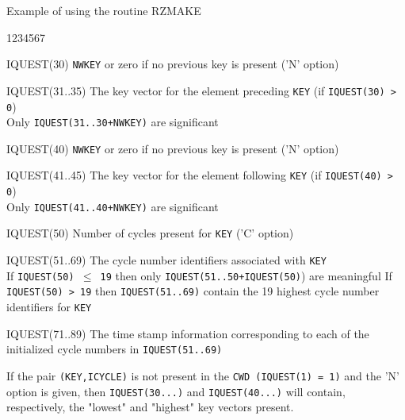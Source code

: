 \begin{XMPt}{Example of using the routine RZMAKE}
\begin{DLtt}{1234567}
\item[IQUEST(30)]{\tt NWKEY} or zero if no previous key is present ('N' option)
\item[IQUEST(31..35)]The key vector for the element preceding {\tt KEY}
(if {\tt IQUEST(30) > 0}) \\
Only {\tt IQUEST(31..30+NWKEY)} are significant\\[3mm]
\item[IQUEST(40)]{\tt NWKEY} or zero if no previous key is present ('N' option)
\item[IQUEST(41..45)]The key vector
for the element following {\tt KEY} (if {\tt IQUEST(40) > 0}) \\
Only {\tt IQUEST(41..40+NWKEY)} are significant \\[3mm]
\item[IQUEST(50)]Number of cycles present for {\tt KEY}
('C' option)
\item[IQUEST(51..69)]The cycle number identifiers associated with {\tt KEY}\\
If {\tt IQUEST(50) $\leq$ 19} then only {\tt IQUEST(51..50+IQUEST(50)})
are meaningful
\newline If {\tt IQUEST(50) > 19} then {\tt IQUEST(51..69)} contain the 19
highest cycle number identifiers for {\tt KEY}
\item[IQUEST(71..89)]The time stamp
information corresponding to each of the
initialized cycle numbers in {\tt IQUEST(51..69)}
\end{DLtt}
\par If the pair {\tt (KEY,ICYCLE)} is not present in the
{\tt CWD (IQUEST(1) = 1)}
and the 'N' option is given, then {\tt IQUEST(30...)} and {\tt IQUEST(40...)}
will contain, respectively, the "lowest" and "highest" key vectors present.

\end{XMPt}
